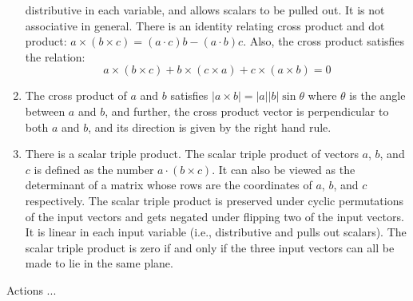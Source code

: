 \documentclass[10pt]{amsart}
\begin{document}
\begin{enumerate}
  distributive in each variable, and allows scalars to be pulled
  out. It is not associative in general. There is an identity relating
  cross product and dot product: $a \times (b \times c) = (a \cdot c)b
  - (a \cdot b)c$. Also, the cross product satisfies the relation: $$a
  \times (b \times c) + b \times (c \times a) + c \times (a \times b)
  = 0$$
\item The cross product of $a$ and $b$ satisfies $|a \times b| =
  |a||b| \sin \theta$ where $\theta$ is the angle between $a$ and $b$,
  and further, the cross product vector is perpendicular to both $a$
  and $b$, and its direction is given by the right hand rule.
\item There is a scalar triple product. The scalar triple product of
  vectors $a$, $b$, and $c$ is defined as the number $a \cdot (b
  \times c)$. It can also be viewed as the determinant of a matrix
  whose rows are the coordinates of $a$, $b$, and $c$
  respectively. The scalar triple product is preserved under cyclic
  permutations of the input vectors and gets negated under flipping
  two of the input vectors. It is linear in each input variable (i.e.,
  distributive and pulls out scalars). The scalar triple product is
  zero if and only if the three input vectors can all be made to lie
  in the same plane.
\end{enumerate}

Actions ...
\end{document}
